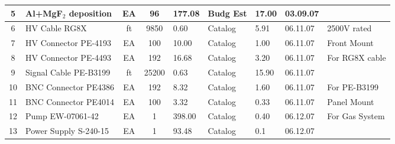\begin{table}
\begin{tabular}{|c|p{3.7cm}|c|c|p{1.4cm}|p{1.6cm}|p{1.5cm}|p{1.2cm}|p{2.5cm}|}
{\footnotesize 5} & {\footnotesize Al+MgF$_{2}$ deposition} & {\footnotesize EA} & {\footnotesize 96} & {\footnotesize 177.08} & {\footnotesize Budg Est} & {\footnotesize 17.00} & {\footnotesize 03.09.07} & {\footnotesize }\\ \hline

{\footnotesize 6} & {\footnotesize HV Cable RG8X} & {\footnotesize ft} & {\footnotesize 9850} & {\footnotesize 0.60} & {\footnotesize Catalog} & {\footnotesize 5.91} & {\footnotesize 06.11.07} & {\footnotesize 2500V rated}\\ \hline

{\footnotesize 7} & {\footnotesize HV Connector PE-4193} & {\footnotesize EA} & {\footnotesize 100} & {\footnotesize 10.00} & {\footnotesize Catalog} & {\footnotesize 1.00} & {\footnotesize 06.11.07} & {\footnotesize Front Mount}\\ \hline

{\footnotesize 8} & {\footnotesize HV Connector PE-4493} & {\footnotesize EA} & {\footnotesize 192} & {\footnotesize 16.68} & {\footnotesize Catalog} & {\footnotesize 3.20} & {\footnotesize 06.11.07} & {\footnotesize For RG8X cable}\\ \hline

{\footnotesize 9} & {\footnotesize Signal Cable PE-B3199} & {\footnotesize ft} & {\footnotesize 25200} & {\footnotesize 0.63} & {\footnotesize Catalog} & {\footnotesize 15.90} & {\footnotesize 06.11.07} & {\footnotesize }\\ \hline

{\footnotesize 10} & {\footnotesize BNC Connector PE4386} & {\footnotesize EA} & {\footnotesize 192} & {\footnotesize 8.32} & {\footnotesize Catalog} & {\footnotesize 1.60} & {\footnotesize 06.11.07} & {\footnotesize For PE-B3199}\\ \hline

{\footnotesize 11} & {\footnotesize BNC Connector PE4014} & {\footnotesize EA} & {\footnotesize 100} & {\footnotesize 3.32} & {\footnotesize Catalog} & {\footnotesize 0.33} & {\footnotesize 06.11.07} & {\footnotesize Panel Mount}\\ \hline

{\footnotesize 12} & {\footnotesize Pump EW-07061-42} & {\footnotesize EA} & {\footnotesize 1} & {\footnotesize 398.00} & {\footnotesize Catalog} & {\footnotesize 0.40} & {\footnotesize 06.12.07} & {\footnotesize For Gas System}\\ \hline

{\footnotesize 13} & {\footnotesize Power Supply S-240-15} & {\footnotesize EA} & {\footnotesize 1} & {\footnotesize 93.48} & {\footnotesize Catalog} & {\footnotesize 0.1} & {\footnotesize 06.12.07} & {\footnotesize }\\ \hline


\end{tabular}
\end{table}

